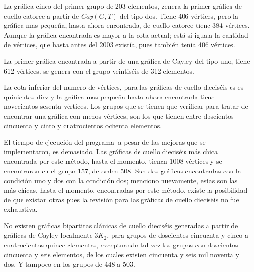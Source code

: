 \documentclass[12pt]{book}
\theoremstyle{definition}
\begin{document}
La gráfica cinco del primer grupo de 203 elementos, genera
la primer gráfica de cuello catorce a partir de $Cay(G,T)$ del tipo
dos. Tiene 406  vértices, pero la gráfica mas pequeña,
hasta ahora encontrada, de cuello catorce tiene 384  vértices. Aunque la gráfica encontrada es mayor a la cota
actual; est\'a si iguala la cantidad de vértices, que hasta antes del
2003 existía, pues también tenia 406 vértices.

La primer gráfica encontrada a partir de una gráfica de Cayley del
tipo uno, tiene 612 vértices, se genera con el grupo
veintiséis de 312 elementos.

La cota inferior del numero de vértices, para las gráficas de cuello
dieciséis es es quinientos diez y la gráfica mas pequeña hasta ahora
encontrada tiene novecientos sesenta vértices. Los grupos que se
tienen que verificar para tratar de encontrar una gráfica con menos
vértices, son los que tienen entre doscientos cincuenta y cinto y
cuatrocientos ochenta elementos.


El tiempo de ejecución del programa, a pesar de las mejoras que se
implementaron, es demasiado. Las gráficas de cuello dieciséis m\'as
chica encontrada por este método, hasta el momento, tienen 1008
vértices y se encontraron en el grupo 157, de orden 508. Son dos
gráficas encontradas con la condición uno y dos con la condición dos;
menciono nuevamente, estas son las m\'as chicas, hasta el momento,
encontradas por este método, existe la posibilidad de que existan
otras pues la revisión para las gráficas de cuello dieciséis no fue
exhaustiva.


No existen gráficas bipartitas clánicas de cuello dieciséis generadas
a partir de gráficas de Cayley localmente $3K_2$, para grupos de
doscientos cincuenta y cinco a cuatrocientos quince elementos,
exceptuando tal vez los grupos con doscientos cincuenta y seis
elementos, de los cuales existen cincuenta y seis mil noventa y dos. Y
tampoco en los grupos de 448 a 503.






\printindex
\end{document}
